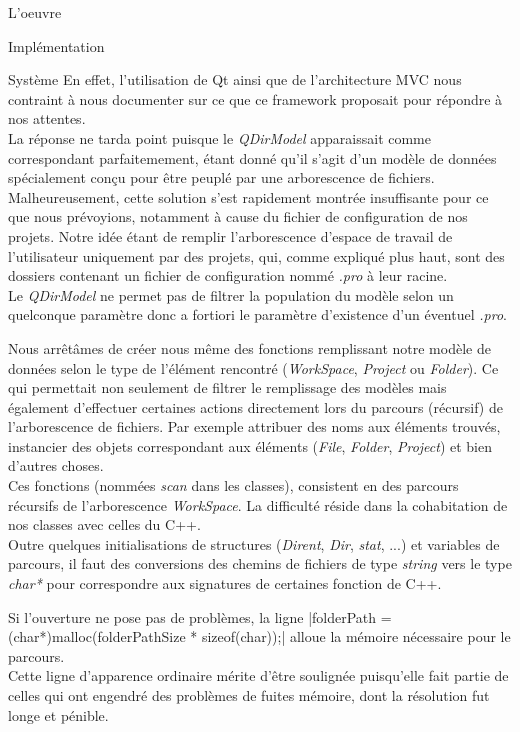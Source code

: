 \documentclass[a4paper, 12pt]{report}
\begin{document}
\begin{part}{L'oeuvre}
\begin{chapter}{Implémentation}
\begin{section}{Système}
				En effet, l'utilisation de \gls{Qt} ainsi que de l'architecture \gls{MVC} nous contraint à nous documenter sur ce que ce 
				framework proposait pour répondre à nos attentes.\\
				La réponse ne tarda point puisque le \emph{QDirModel} apparaissait comme correspondant parfaitemement, étant donné qu'il s'agit d'un
				modèle de données spécialement conçu pour être peuplé par une arborescence de fichiers.\\


				Malheureusement, cette solution s'est rapidement montrée insuffisante pour ce que nous prévoyions, notamment à cause du fichier de 
				configuration de nos projets. Notre idée étant de remplir l'arborescence d'espace de travail de l'utilisateur uniquement par des
				projets, qui, comme expliqué plus haut, sont des dossiers contenant un fichier de configuration nommé \emph{.pro} à leur racine.\\
				Le \emph{QDirModel} ne permet pas de filtrer la population du modèle selon un quelconque paramètre donc a fortiori le paramètre
				d'existence d'un éventuel \emph{.pro}.

				Nous arrêtâmes de créer nous même des fonctions remplissant notre modèle de données selon le type de l'élément rencontré
				(\emph{WorkSpace}, \emph{Project} ou \emph{Folder}). Ce qui permettait non seulement de filtrer le remplissage des modèles mais
				également d'effectuer certaines actions directement lors du parcours (récursif) de l'arborescence de fichiers.
				Par exemple attribuer des noms aux éléments trouvés, instancier des objets correspondant aux éléments (\emph{File}, \emph{Folder},
				\emph{Project}) et bien d'autres choses.\\


				Ces fonctions (nommées \emph{scan} dans les classes), consistent en des parcours récursifs de l'arborescence \emph{WorkSpace}.
				La difficulté réside dans la cohabitation de nos classes avec celles du \gls{C++}.\\
				Outre quelques initialisations de structures (\emph{Dirent}, \emph{Dir}, \emph{stat}, ...) et variables de parcours, il faut des
				conversions des chemins de fichiers de type \emph{string} vers le type \emph{char*} pour correspondre aux signatures de certaines
				fonction de \gls{C++}.


				Si l'ouverture ne pose pas de problèmes, la ligne |folderPath = (char*)malloc(folderPathSize * sizeof(char));|
				alloue la mémoire nécessaire pour le parcours.\\
				Cette ligne d'apparence ordinaire mérite d'être soulignée puisqu'elle fait partie de celles qui ont engendré des problèmes de fuites
				mémoire, dont la résolution fut longe et pénible.\\



\end{section}
\end{chapter}
\end{part}
\end{document}
